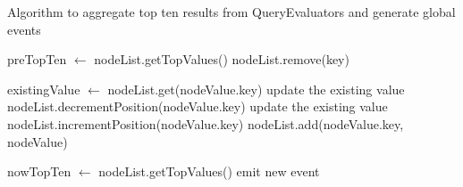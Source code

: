 \begin{algorithm}
\caption{Algorithm to aggregate top ten results from QueryEvaluators and generate global events}
\label{aggregate_algorithm}
\begin{algorithmic}

\STATE preTopTen $\leftarrow$ nodeList.getTopValues()
	\STATE nodeList.remove(key)
\ENDFOR

		\STATE existingValue $\leftarrow$ nodeList.get(nodeValue.key)
			\STATE update the existing value
			\STATE nodeList.decrementPosition(nodeValue.key)
		\ELSE
			\STATE update the existing value
			\STATE nodeList.incrementPosition(nodeValue.key)
		\ENDIF
	\ELSE
		\STATE nodeList.add(nodeValue.key, nodeValue)
	\ENDIF
\ENDFOR

\STATE nowTopTen $\leftarrow$ nodeList.getTopValues()
	\STATE emit new event
\ENDIF
\end{algorithmic}
\end{algorithm}
